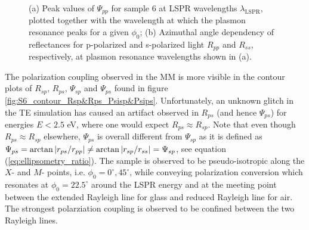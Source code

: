 \begin{figure}[h]
\begin{subfigure}{0.5\textwidth}
        \caption{}
        \label{fig:S6_LSPRvsphi_RppRss}
    \end{subfigure}
    \caption{(a) Peak values of $\Psi_{pp}$ for sample 6 at LSPR wavelengths $\lambda_{\text{LSPR}}$, plotted together with the wavelength at which the plasmon resonance peaks for a given $\phi_0$; (b) Azimuthal angle dependency of reflectances for p-polarized and s-polarized light $R_{pp}$ and $R_{ss}$, respectively, at plasmon resonance wavelengths shown in (a).}
    \label{fig:S6_LSPRvsphi}
\end{figure}

The polarization coupling observed in the MM is more visible in the contour plots of $R_{sp}$, $R_{ps}$, $\Psi_{sp}$ and $\Psi_{ps}$ found in figure \ref{fig:S6_contour_Rsp&Rps_Psisp&Psips}. Unfortunately, an unknown glitch in the TE simulation has caused an artifact observed in $R_{ps}$ (and hence $\Psi_{ps}$) for energies $E<2.5$ eV, where one would expect $R_{ps}\approx R_{sp}$. Note that even though $R_{ps}\approx R_{sp}$ elsewhere, $\Psi_{ps}$ is overall different from $\Psi_{sp}$ as it is defined as $\Psi_{ps}=\arctan\left| r_{ps}/r_{pp} \right|\neq \arctan\left| r_{sp}/r_{ss} \right| = \Psi_{sp}$, see equation (\ref{eq:ellipsometry_ratio}). The sample is observed to be pseudo-isotropic along the $X$- and $M$- points, i.e. $\phi_0=0^\circ, 45^\circ$, while conveying polarization conversion which resonates at $\phi_0=22.5^\circ$ around the LSPR energy and at the meeting point between the extended Rayleigh line for glass and reduced Rayleigh line for air. The strongest polarziation coupling is observed to be confined between the two Rayleigh lines.
